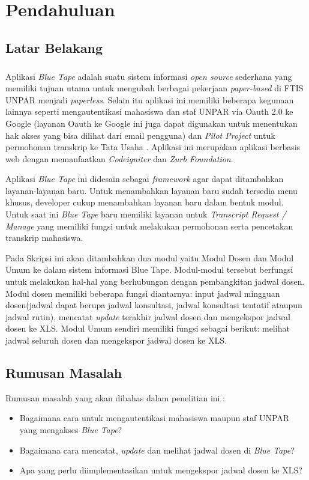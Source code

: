 \chapter{Pendahuluan}
\label{chap:intro}
   
\section{Latar Belakang}
\label{sec:label}

\paragraph{} Aplikasi \textit{Blue Tape} adalah suatu sistem informasi \textit{open source} sederhana yang memiliki tujuan utama untuk mengubah berbagai pekerjaan \textit{paper-based} di FTIS UNPAR menjadi \textit{paperless}. Selain itu aplikasi ini memiliki beberapa kegunaan lainnya seperti mengautentikasi mahasiswa dan staf UNPAR via Oauth 2.0 ke Google (layanan Oauth ke Google ini juga dapat digunakan untuk menentukan hak akses yang bisa dilihat dari email pengguna) dan \textit{Pilot Project} untuk permohonan transkrip ke Tata Usaha . Aplikasi ini merupakan aplikasi berbasis web dengan memanfaatkan \textit{Codeigniter} dan \textit{Zurb Foundation}. 

Aplikasi \textit{Blue Tape} ini didesain sebagai \textit{framework} agar dapat ditambahkan layanan-layanan baru. Untuk menambahkan layanan baru sudah tersedia menu khusus, developer cukup menambahkan layanan baru dalam bentuk modul. Untuk saat ini \textit{Blue Tape} baru memiliki layanan untuk \textit{Transcript Request / Manage} yang memiliki fungsi untuk melakukan permohonan serta pencetakan transkrip mahasiswa.

Pada Skripsi ini akan ditambahkan dua modul yaitu Modul Dosen dan Modul Umum ke dalam sistem informasi Blue Tape. Modul-modul tersebut berfungsi untuk melakukan hal-hal yang berhubungan dengan pembangkitan jadwal dosen. Modul dosen memiliki beberapa fungsi diantarnya: input jadwal mingguan dosen(jadwal dapat berupa jadwal konsultasi, jadwal konsultasi tentatif ataupun jadwal rutin), mencatat \textit{update} terakhir jadwal dosen dan mengekspor jadwal dosen ke XLS. Modul Umum sendiri memiliki fungsi sebagai berikut: melihat jadwal seluruh dosen dan mengekspor jadwal dosen ke XLS.


\section{Rumusan Masalah}
\label{sec:rumusan}
Rumusan masalah yang akan dibahas dalam penelitian ini :
	\begin{itemize}
		\item Bagaimana cara untuk mengautentikasi mahasiswa maupun staf UNPAR yang mengakses \textit{Blue Tape}?
		\item Bagaimana cara mencatat, \textit{update} dan melihat jadwal dosen di \textit{Blue Tape}?
		\item Apa yang perlu diimplementasikan untuk mengekspor jadwal dosen ke XLS?
	\end{itemize} 



